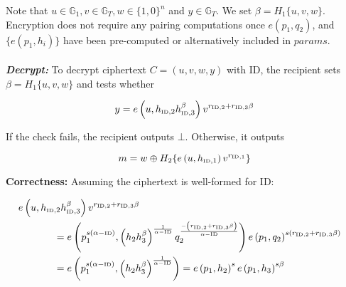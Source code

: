 \documentclass[11pt]{article}
\begin{document}
Note that $u \in \mathds{G}_1, v \in \mathds{G}_T,  w \in \{ 1, 0 \}^n$ and $y \in \mathds{G}_T$. We set $\beta = H_1 \{ u, v, w \}$. Encryption does not require any pairing computations once $e \left( p_1, q_2 \right)$, and $\{ e \left( p_1, h_i \right) \}$ have been pre-computed or alternatively included in $params$.\\
\\
\textbf{\textit{Decrypt:}} To decrypt ciphertext $C = \left( u, v, w, y \right)$ with ID, the recipient sets $\beta=H_1 \{ u, v, w \}$ and tests whether

\begin{equation*}
 y = e \left( u, h_{\textrm{\tiny{ID}}, 2}h_{\textrm{\tiny{ID}}, 3}^{\beta} \right)v^{r_{\textrm{\tiny{ID}},2}+r_{\textrm{\tiny{ID}},3}\beta}
\end{equation*}

If the check fails, the recipient outputs $\bot$. Otherwise, it outputs

\begin{equation*}
 m = w \oplus H_2 \{ e \left( u, h_{\textrm{\tiny{ID}}, 1} \right) v^{r_{\textrm{\tiny{ID}}, 1}} \}
\end{equation*}

\textbf{Correctness:} Assuming the ciphertext is well-formed for ID:

\begin{equation*}
 \begin{split}
  e \left( u, h_{\textrm{\tiny{ID}},2} h_{\textrm{\tiny{ID}},3}^{\beta} \right) v^{ r_{\textrm{\tiny{ID}},2} + r_{\textrm{\tiny{ID}},3} \beta} \\
  & \negthickspace \negthickspace \negthickspace \negthickspace \negthickspace \negthickspace \negthickspace \negthickspace \negthickspace \negthickspace \negthickspace \negthickspace \negthickspace \negthickspace \negthickspace \negthickspace\negthickspace \negthickspace \negthickspace \negthickspace \negthickspace \negthickspace \negthickspace \negthickspace \negthickspace \negthickspace \negthickspace \negthickspace \negthickspace \negthickspace \negthickspace = e \left( p_1^{s\left( \alpha - \textrm{\tiny{ID}} \right)}, \left( h_{2}h_{3}^{\beta} \right)^{\frac{1}{\alpha - \textrm{\tiny{ID}}}} q_2^{\frac{- \left( r_{\textrm{\tiny{ID}},2} + r_{\textrm{\tiny{ID}},3} \beta \right)}{\alpha - \textrm{\tiny{ID}}}} \right) e \left( p_1, q_2 \right)^{s \left( r_{\textrm{\tiny{ID}},2} + r_{\textrm{\tiny{ID}},3} \beta \right)} \\
 & \negthickspace \negthickspace \negthickspace \negthickspace \negthickspace \negthickspace \negthickspace \negthickspace \negthickspace \negthickspace \negthickspace \negthickspace \negthickspace \negthickspace \negthickspace \negthickspace \negthickspace \negthickspace \negthickspace \negthickspace \negthickspace \negthickspace \negthickspace \negthickspace \negthickspace \negthickspace \negthickspace \negthickspace \negthickspace \negthickspace \negthickspace = e \left( p_1^{s\left( \alpha - \textrm{\tiny{ID}} \right)}, \left( h_{2}h_{3}^{\beta} \right)^{\frac{1}{\alpha - \textrm{\tiny{ID}}}} \right) = e \left( p_1, h_2 \right)^s e \left( p_1, h_3\right)^{s \beta}
 \end{split}
\end{equation*}
\end{document}
